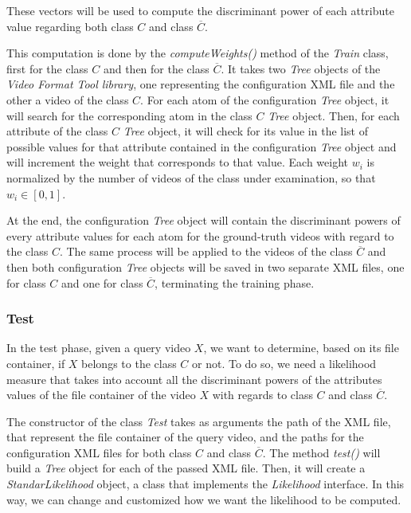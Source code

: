 These vectors will be used to compute the discriminant power of each attribute value regarding both class $C$ and class $\overline{C}$.

This computation is done by the \emph{computeWeights()} method of the \emph{Train} class, first for the class $C$ and then for the class $\overline{C}$. It takes two \emph{Tree} objects of the \emph{Video Format Tool library}, one representing the configuration XML file and the other a video of the class $C$. For each atom of the configuration \emph{Tree} object, it will search for the corresponding atom in the class $C$ \emph{Tree} object. Then, for each attribute of the class $C$ \emph{Tree} object, it will check for its value in the list of possible values for that attribute contained in the configuration \emph{Tree} object and will increment the weight that corresponds to that value. Each weight $w_{i}$ is normalized by the number of videos of the class under examination, so that $w_{i} \in \left[0, 1\right] $.

At the end, the configuration \emph{Tree} object will contain the discriminant powers of every attribute values for each atom for the ground-truth videos with regard to the class $C$. The same process will be applied to the videos of the class $\overline{C}$ and then both configuration \emph{Tree} objects will be saved in two separate XML files, one for class $C$ and one for class $\overline{C}$, terminating the training phase.


\subsubsection*{Test}

In the test phase, given a query video $X$, we want to determine, based on its file container, if $X$ belongs to the class $C$ or not. To do so, we need a likelihood measure that takes into account all the discriminant powers of the attributes values of the file container of the video $X$ with regards to class $C$ and class $\overline{C}$.

The constructor of the class \emph{Test} takes as arguments the path of the XML file, that represent the file container of the query video, and the paths for the configuration XML files for both class $C$ and class $\overline{C}$.
The method \emph{test()} will build a \emph{Tree} object for each of the passed XML file. Then, it will create a \emph{StandarLikelihood} object, a class that implements the \emph{Likelihood} interface. In this way, we can change and customized how we want the likelihood to be computed.

